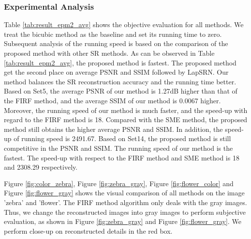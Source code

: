 \documentclass[review,numbers,sort&compress]{elsarticle}  %
\begin{document}
\subsubsection{Experimental Analysis}
Table \ref{tab:result_epm2_avg} shows the objective evaluation for all methods. We treat the bicubic method as the baseline and set its running time to zero. Subsequent analysis of the running speed is based on the comparison of the proposed method with other SR methods. As can be observed in Table \ref{tab:result_epm2_avg}, the proposed method is fastest. The proposed method get the second place on average PSNR and SSIM followed by LapSRN. Our method balances the SR reconstruction accuracy and the running time better. Based on Set5, the average PSNR of our method is 1.27dB higher than that of the FIRF method, and the average SSIM of our method is 0.0067 higher. Moreover, the running speed of our method is much faster, and the speed-up with regard to the FIRF method is 18. Compared with the SME method, the proposed method still obtains the higher average PSNR and SSIM. In addition, the speed-up of running speed is 2491.67. Based on Set14, the proposed method is still competitive in the PSNR and SSIM. The running speed of our method is the fastest. The speed-up with respect to the FIRF method and SME method is 18 and 2308.29 respectively.

Figure \ref{fig:color_zebra}, Figure \ref{fig:zebra_gray}, Figure \ref{fig:flower_color} and Figure \ref{fig:flower_gray} shows the visual comparison of all methods on the image 'zebra' and 'flower'. The FIRF method algorithm only deals with the gray images. Thus, we change the reconstructed images into gray images to perform subjective evaluation, as shown in Figure \ref{fig:zebra_gray} and Figure \ref{fig:flower_gray}. We perform close-up on reconstructed details in the red box.
\end{document}
